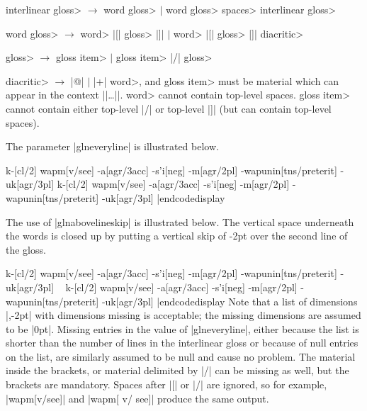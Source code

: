 \<interlinear gloss> $\to$ \<word gloss> $\vert$
   \<word gloss> \<spaces> \<interlinear gloss>

\<word gloss> $\to$
   \<word> |[| \<gloss> |]| $\vert$
   \<word> |[| \<gloss> |]| \<diacritic>

\<gloss> $\to$ \<gloss item> $\vert$ \<gloss item> |/| \<gloss>

\<diacritic> $\to$ |@| $\vert$ |+|
\bigskip
\endgroup
\noindent
\<word>, and \<gloss item> must be material
which can appear in the context |\hbox{|\dots|}|. \<word> cannot
contain top-level spaces. \<gloss item> cannot contain either
top-level |/| or top-level |]| (but can contain top-level spaces).





The parameter |glneveryline| is illustrated below.

\framedisplay
\ex[glstyle=nlevel,glneveryline={\it,\sc,\sc}]
\begingl
k-[cl/2]
wapm[v/\rm see]
-a[agr/3acc]
-s'i[neg]
-m[agr/\sc 2pl]
-wapunin[tns/preterit]
-uk[agr/3pl]
\endgl
\xe
\endframedisplay
\codedisplay
\ex[glstyle=nlevel,glneveryline={\it,\sc,\sc}]
\begingl
k-[cl/2]
wapm[v/\rm see]
-a[agr/3acc]
-s'i[neg]
-m[agr/\sc 2pl]
-wapunin[tns/preterit]
-uk[agr/3pl]
\endgl
\xe
|endcodedisplay

The use of |glnabovelineskip| is illustrated below.  The vertical
space underneath the words is closed up by putting a vertical skip of
-2pt over the second line of the gloss.

\framedisplay
\ex[glstyle=nlevel,glneveryline={\it,\sc,\sc},
   glnabovelineextraskip={,-2pt}]
\begingl
k-[cl/2]
wapm[v/\rm see]
-a[agr/3acc]
-s'i[neg]
-m[agr/\sc 2pl]
-wapunin[tns/preterit]
-uk[agr/3pl]
\endgl
\xe
\endframedisplay
\codedisplay~
\ex[glstyle=nlevel,glneveryline={\it,\sc,\sc},
   glnabovelineextraskip={,-2pt}]
\begingl
k-[cl/2]
wapm[v/\rm see]
-a[agr/3acc]
-s'i[neg]
-m[agr/\sc 2pl]
-wapunin[tns/preterit]
-uk[agr/3pl]
\endgl
\xe
|endcodedisplay
Note that a list of dimensions |{,-2pt}| with dimensions missing is
acceptable; the missing dimensions are assumed to be |0pt|.  Missing
entries in the value of |glneveryline|, either because the list is
shorter than the number of lines in the interlinear gloss or because
of null entries on the list, are similarly assumed to be null and
cause no problem.  The material inside the brackets, or material
delimited by |/| can be missing as well, but the brackets are
mandatory.  Spaces after |[| or |/| are ignored, so for example,
|wapm[v/\rm see]| and |wapm[ v/ \rm see]| produce the same output.

